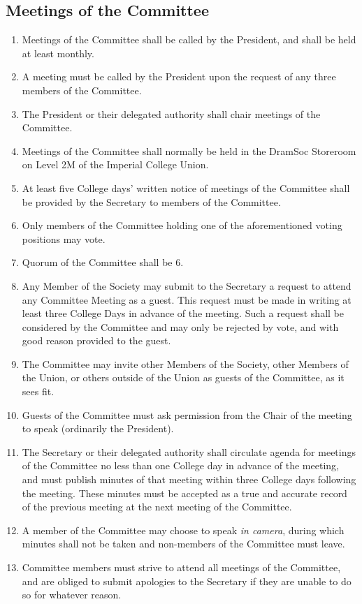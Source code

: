 \documentclass[a4paper]{tufte-handout}
\newcommand{\policyOffset}{12pt}
\newcommand{\policyBye}[2][\policyOffset]{\marginnote[#1]{\textsc{Bye-laws \S#2}}}
\begin{document}
\subsection{Meetings of the Committee}
\begin{enumerate}[resume]
    \item Meetings of the Committee shall be called by the President, and shall be held at least monthly.
    \item A meeting must be called by the President upon the request of any three members of the Committee.
    \item The President or their delegated authority shall chair meetings of the Committee.
    \item Meetings of the Committee shall normally be held in the DramSoc Storeroom on Level 2M of the Imperial College Union.
    \item At least five College days' written notice of meetings of the Committee shall be provided by the Secretary to members of the Committee.
    \item Only members of the Committee holding one of the aforementioned voting positions may vote.
    \item \policyBye{B11} Quorum of the Committee shall be 6.
    \item Any Member of the Society may submit to the Secretary a request to attend any Committee Meeting as a guest. This request must be made in writing at least three College Days in advance of the meeting. Such a request shall be considered by the Committee and may only be rejected by vote, and with good reason provided to the guest.
    \item The Committee may invite other Members of the Society, other Members of the Union, or others outside of the Union as guests of the Committee, as it sees fit. 
    \item Guests of the Committee must ask permission from the Chair of the meeting to speak (ordinarily the President).
    \item The Secretary or their delegated authority shall circulate agenda for meetings of the Committee no less than one College day in advance of the meeting, and must publish minutes of that meeting within three College days following the meeting. These minutes must be accepted as a true and accurate record of the previous meeting at the next meeting of the Committee.
    \item A member of the Committee may choose to speak \textit{in camera}, during which minutes shall not be taken and non-members of the Committee must leave.
    \item Committee members must strive to attend all meetings of the Committee, and are obliged to submit apologies to the Secretary if they are unable to do so for whatever reason.
\end{enumerate}
\end{document}
